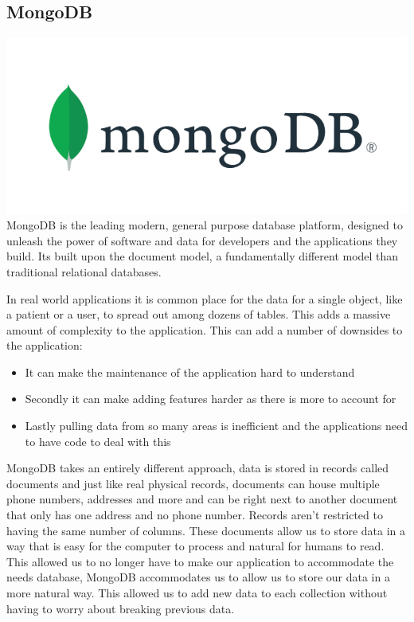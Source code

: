\subsection{MongoDB}
\includegraphics[scale=0.5]{img/MongoDB-logo.png} \newline
MongoDB is the leading modern, general purpose database platform, designed to unleash the power of software and data for developers and the applications they build. Its built upon the document model, a fundamentally different model than traditional relational databases. \par
In real world applications it is common place for the data for a single object, like a patient or a user, to spread out among dozens of tables. This adds a massive amount of complexity to the application. This can add a number of downsides to the application:
\begin{itemize}
\item It can make the maintenance of the application hard to understand
\item Secondly it can make adding features harder as there is more to account for
\item Lastly pulling data from so many areas is inefficient and the applications need to have code to deal with this
\end{itemize}
\par MongoDB takes an entirely different approach, data is stored in records called documents and just like real physical records, documents can house multiple phone numbers, addresses and more and can be right next to another document that only has one address and no phone number. Records aren't restricted to having the same number of columns. These documents allow us to store data in a way that is easy for the computer to process and natural for humans to read. This allowed us to no longer have to make our application to accommodate the needs database, MongoDB accommodates us to allow us to store our data in a more natural way. This allowed us to add new data to each collection without having to worry about breaking previous data. \par

